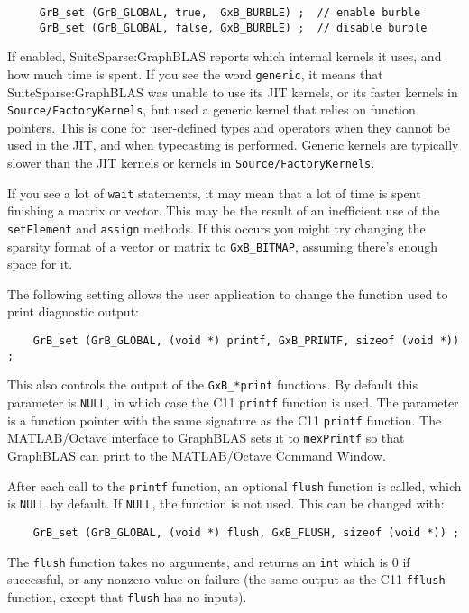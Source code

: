 {\footnotesize
\begin{verbatim}
     GrB_set (GrB_GLOBAL, true,  GxB_BURBLE) ;  // enable burble
     GrB_set (GrB_GLOBAL, false, GxB_BURBLE) ;  // disable burble \end{verbatim}}

If enabled, SuiteSparse:GraphBLAS reports which internal kernels it uses, and
how much time is spent.  If you see the word \verb'generic', it means that
SuiteSparse:GraphBLAS was unable to use its JIT kernels, or its faster kernels
in \verb'Source/FactoryKernels', but used a generic kernel that relies on
function pointers.  This is done for user-defined types and operators when they
cannot be used in the JIT, and when typecasting is performed.  Generic kernels
are typically slower than the JIT kernels or kernels in
\verb'Source/FactoryKernels'.

If you see a lot of \verb'wait' statements, it may mean that a lot of time is
spent finishing a matrix or vector.  This may be the result of an inefficient
use of the \verb'setElement' and \verb'assign' methods.  If this occurs you
might try changing the sparsity format of a vector or matrix to
\verb'GxB_BITMAP', assuming there's enough space for it.

The following setting allows the user application to change the
function used to print diagnostic output:

{\small
\begin{verbatim}
    GrB_set (GrB_GLOBAL, (void *) printf, GxB_PRINTF, sizeof (void *)) ; \end{verbatim} }

This also controls the output of the
\verb'GxB_*print' functions.  By default this parameter is \verb'NULL', in
which case the C11 \verb'printf' function is used.  The parameter is a
function pointer with the same signature as the C11 \verb'printf'
function.  The MATLAB/Octave interface to GraphBLAS sets it to \verb'mexPrintf'
so that GraphBLAS can print to the MATLAB/Octave Command Window.

After each call to the \verb'printf' function, an optional
\verb'flush' function is called, which is \verb'NULL' by default.  If
\verb'NULL', the function is not used.  This can be changed with:

{\small
\begin{verbatim}
    GrB_set (GrB_GLOBAL, (void *) flush, GxB_FLUSH, sizeof (void *)) ; \end{verbatim} }

The \verb'flush' function takes no
arguments, and returns an \verb'int' which is 0 if successful, or any nonzero
value on failure (the same output as the C11 \verb'fflush' function,
except that \verb'flush' has no inputs).

